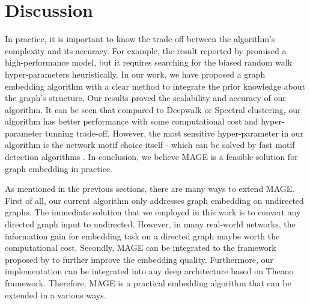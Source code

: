 \documentclass[letterpaper]{article}
\begin{document}
            \begin{table}
                \centering
                \caption{Weighted f1-macro score.}
                \label{tb:re}
            \end{table}

    \section{Discussion}

        In practice, it is important to know the trade-off between the algorithm's complexity
        and its accuracy. For example, the result reported by \cite{node2vec} promised a high-performance
        model, but it requires searching for the biased random walk hyper-parameters
        heuristically. In our work, we have proposed a graph embedding algorithm with a clear
        method to integrate the prior knowledge about the graph's structure. Our results
        proved the scalability and accuracy of our algorithm. It can be seen that compared to 
        Deepwalk or Spectral clustering, our algorithm has better performance with some computational
        cost and hyper-parameter tunning trade-off. However, the most sensitive hyper-parameter
        in our algorithm is the network motif choice itself - which can be solved by fast motif detection
        algorithms \cite{motifdecrev}. In conclusion, we believe MAGE is a feasible solution
        for graph embedding in practice.

        As mentioned in the previous sections, there are many ways to extend MAGE\@. First of all,
        our current algorithm only addresses graph embedding on undirected graphs. The immediate 
        solution that we employed in this work is to convert any directed graph input to undirected.
        However, in many real-world networks, the information gain for embedding task on a directed graph
        maybe worth the computational cost. Secondly, MAGE can be integrated to the framework proposed
        by \citeauthor{planetoid} to further improve the embedding quality. Furthermore, our implementation 
        can be integrated into any deep architecture based on Theano framework. Therefore, MAGE is a 
        practical embedding algorithm that can be extended in a various ways.

    
    
\end{document}
